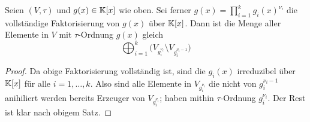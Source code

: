 \begin{kor}
  \label{kor:anzahl_erzeuger}
  Seien $(V,\tau)$ und $g(x)\in \mathbb{K}[x]$ wie oben. Sei ferner
  $g(x) = \prod_{i=1}^k g_i(x)^{\nu_i}$ die vollständige Faktorisierung von 
  $g(x)$ über $\mathbb{K}[x]$. Dann ist die Menge aller Elemente 
  in $V$ mit $\tau$-Ordnung $g(x)$ gleich
  \[ \bigoplus_{i=1}^k \big( V_{g_i^{\nu_i}} \setminus V_{g_i^{\nu_i-1}} \big)\]
\end{kor}
\begin{proof}
  Da obige Faktorisierung vollständig ist, sind die $g_i(x)$ irreduzibel über
  $\mathbb{K}[x]$ für alle $i=1,\ldots,k$. Also sind alle Elemente 
  in $V_{g_i^{\nu_i}}$ die nicht von $g_i^{\nu_i-1}$ anihiliert werden bereits
  Erzeuger von $V_{g_i^{\nu_i}}$; haben mithin $\tau$-Ordnung $g_i^{\nu_i}$.
  Der Rest ist klar nach obigem Satz.
\end{proof}
